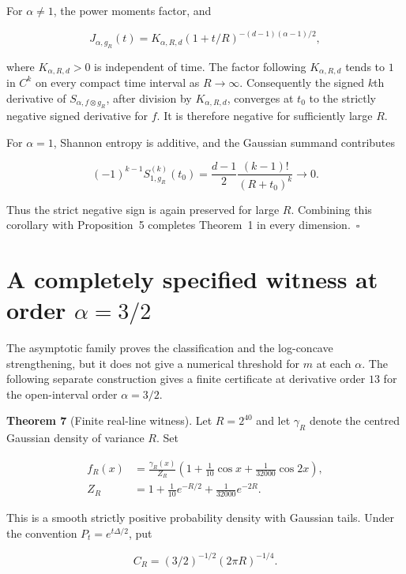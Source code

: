 \documentclass[
  11pt,
]{article}
\begin{document}
For \(\alpha\ne1\), the power moments factor, and

\[
J_{\alpha,g_R}(t)=K_{\alpha,R,d}
  (1+t/R)^{-(d-1)(\alpha-1)/2},
\]

where \(K_{\alpha,R,d}>0\) is independent of time. The factor following
\(K_{\alpha,R,d}\) tends to \(1\) in \(C^k\) on every compact time
interval as \(R\to\infty\). Consequently the signed \(k\)th derivative
of \(S_{\alpha,f\otimes g_R}\), after division by \(K_{\alpha,R,d}\),
converges at \(t_0\) to the strictly negative signed derivative for
\(f\). It is therefore negative for sufficiently large \(R\).

For \(\alpha=1\), Shannon entropy is additive, and the Gaussian summand
contributes

\[
(-1)^{k-1}S_{1,g_R}^{(k)}(t_0)
 =\frac{d-1}{2}\frac{(k-1)!}{(R+t_0)^k}\longrightarrow0.
\]

Thus the strict negative sign is again preserved for large \(R\).
Combining this corollary with Proposition~5 completes Theorem~1 in every
dimension.~\(\square\)

\section{\texorpdfstring{A completely specified witness at order
\(\alpha=3/2\)}{A completely specified witness at order \textbackslash alpha=3/2}}\label{a-completely-specified-witness-at-order-alpha32}

The asymptotic family proves the classification and the log-concave
strengthening, but it does not give a numerical threshold for \(m\) at
each \(\alpha\). The following separate construction gives a finite
certificate at derivative order \(13\) for the open-interval order
\(\alpha=3/2\).

\textbf{Theorem 7} (Finite real-line witness). Let \(R=2^{40}\) and let
\(\gamma_R\) denote the centred Gaussian density of variance \(R\). Set

\[
\tag{29}
 \begin{aligned}
 f_R(x)&=\frac{\gamma_R(x)}{Z_R}
    \left(1+\frac1{10}\cos x+\frac1{32000}\cos2x\right),\\
 Z_R&=1+\frac1{10}e^{-R/2}+\frac1{32000}e^{-2R}.
 \end{aligned}
\]

This is a smooth strictly positive probability density with Gaussian
tails. Under the convention \(P_t=e^{t\Delta/2}\), put

\[
C_R=(3/2)^{-1/2}(2\pi R)^{-1/4}.
\]
\end{document}
